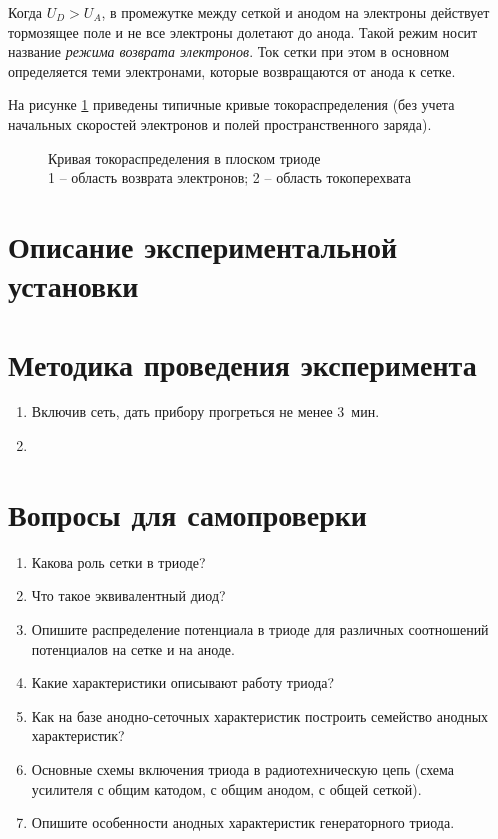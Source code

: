 Когда \( U_D > U_A \), в промежутке между сеткой и анодом на электроны
действует тормозящее поле и не все электроны долетают до анода. Такой режим
носит название \emph{режима возврата электронов}. Ток сетки при этом в основном
определяется теми электронами, которые возвращаются от анода к сетке.

На рисунке \ref{pic5} приведены типичные кривые токораспределения (без учета
начальных скоростей электронов и полей пространственного заряда).

\begin{figure}[ht]
    \center
    \caption{Кривая токораспределения в плоском триоде\\
    1 -- область возврата электронов; 2 -- область токоперехвата}
    \label{pic5}
\end{figure}

\section{Описание экспериментальной установки}

\section{Методика проведения эксперимента}
\renewcommand{\labelenumi}{4.\arabic{enumi}.}
\begin{enumerate}
    \item Включив сеть, дать прибору прогреться не менее 3~мин.
    \item 
\end{enumerate}

\section*{Вопросы для самопроверки}
\vspace{-1.5em}
\renewcommand{\labelenumi}{\arabic{enumi}.}
\begin{enumerate}
    \singlespacing
    \itemsep -.5pt
    \item Какова роль сетки в триоде?
    \item Что такое эквивалентный диод?
    \item Опишите распределение потенциала в триоде для различных соотношений
    потенциалов на сетке и на аноде.
    \item Какие характеристики описывают работу триода?
    \item Как на базе анодно-сеточных характеристик построить семейство
    анодных характеристик?
    \item Основные схемы включения триода в радиотехническую цепь (схема
    усилителя с общим катодом, с общим анодом, с общей сеткой).
    \item Опишите особенности анодных характеристик генераторного триода.
\end{enumerate}

